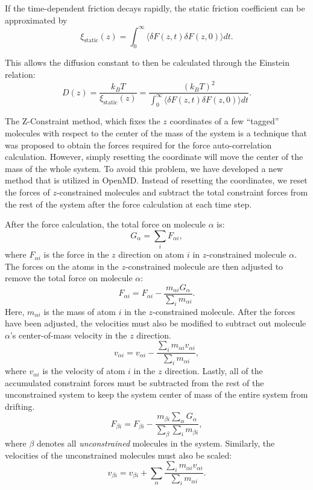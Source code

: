 \documentclass[letterpaper]{report}
\begin{document}
If the time-dependent friction decays rapidly, the static friction
coefficient can be approximated by
\begin{equation}
\xi_{\text{static}}(z)=\int_{0}^{\infty}\langle\delta F(z,t)\delta F(z,0)\rangle dt.
\end{equation}

This allows the diffusion constant to then be calculated through the
Einstein relation:\cite{Marrink94}
\begin{equation}
D(z)=\frac{k_{B}T}{\xi_{\text{static}}(z)}=\frac{(k_{B}T)^{2}}{\int_{0}^{\infty
}\langle\delta F(z,t)\delta F(z,0)\rangle dt}.%
\end{equation}

The Z-Constraint method, which fixes the $z$ coordinates of a few
``tagged'' molecules with respect to the center of the mass of the
system is a technique that was proposed to obtain the forces required
for the force auto-correlation calculation.\cite{Marrink94} However,
simply resetting the coordinate will move the center of the mass of
the whole system. To avoid this problem, we have developed a new
method that is utilized in OpenMD. Instead of resetting the
coordinates, we reset the forces of $z$-constrained molecules and
subtract the total constraint forces from the rest of the system after
the force calculation at each time step.

After the force calculation, the total force on molecule $\alpha$ is:
\begin{equation}
G_{\alpha} = \sum_i F_{\alpha i},
\label{eq:zc1}
\end{equation}
where $F_{\alpha i}$ is the force in the $z$ direction on atom $i$ in
$z$-constrained molecule $\alpha$. The forces on the atoms in the
$z$-constrained molecule are then adjusted to remove the total force
on molecule $\alpha$:
\begin{equation}
F_{\alpha i} = F_{\alpha i} - 
	\frac{m_{\alpha i} G_{\alpha}}{\sum_i m_{\alpha i}}.
\end{equation}
Here, $m_{\alpha i}$ is the mass of atom $i$ in the $z$-constrained
molecule.  After the forces have been adjusted, the velocities must
also be modified to subtract out molecule $\alpha$'s center-of-mass
velocity in the $z$ direction.
\begin{equation}
v_{\alpha i} = v_{\alpha i} -
	\frac{\sum_i m_{\alpha i} v_{\alpha i}}{\sum_i m_{\alpha i}},
\end{equation}
where $v_{\alpha i}$ is the velocity of atom $i$ in the $z$ direction.
Lastly, all of the accumulated constraint forces must be subtracted
from the rest of the unconstrained system to keep the system center of
mass of the entire system from drifting.
\begin{equation}
F_{\beta i} = F_{\beta i} - \frac{m_{\beta i} \sum_{\alpha} G_{\alpha}}
	{\sum_{\beta}\sum_i m_{\beta i}},
\end{equation}
where $\beta$ denotes all {\it unconstrained} molecules in the
system. Similarly, the velocities of the unconstrained molecules must
also be scaled:
\begin{equation}
v_{\beta i} = v_{\beta i} + \sum_{\alpha} \frac{\sum_i m_{\alpha i}
v_{\alpha i}}{\sum_i m_{\alpha i}}.
\end{equation}
\end{document}
